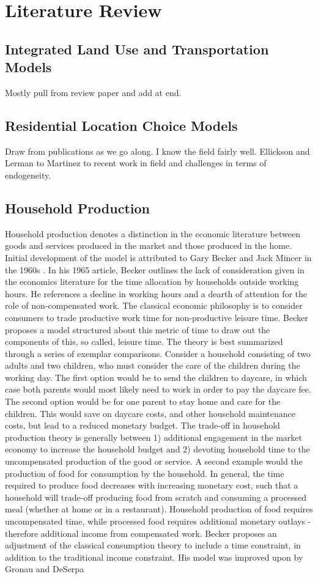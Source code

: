\chapter{Literature Review}
\section{Integrated Land Use and Transportation Models}
Mostly pull from review paper and add at end.

\section{Residential Location Choice Models}
Draw from publications as we go along. I know the field fairly well. Ellickson and Lerman to Martinez to recent work in field and challenges in terms of endogeneity.

\section{Household Production}
Household production denotes a distinction in the economic literature between goods and services produced in the market and those produced in the home. Initial development of the model is attributed to Gary Becker and Jack Mincer in the 1960s \cite{Becker1965}. In his 1965 article, Becker outlines the lack of consideration given in the economics literature for the time allocation by households outside working hours. He references a decline in working hours and a dearth of attention for the role of non-compensated work. The classical economic philosophy is to consider consumers to trade productive work time for non-productive leisure time. Becker proposes a model structured about this metric of time to draw out the components of this, so called, leisure time. The theory is best summarized through a series of exemplar comparisons. Consider a household consisting of two adults and two children, who must consider the care of the children during the working day. The first option would be to send the children to daycare, in which case both parents would most likely need to work in order to pay the daycare fee. The second option would be for one parent to stay home and care for the children. This would save on daycare costs, and other household maintenance costs, but lead to a reduced monetary budget. The trade-off in household production theory is generally between 1) additional engagement in the market economy to increase the household budget and 2) devoting household time to the uncompensated production of the good or service. A second example would the production of food for consumption by the household. In general, the time required to produce food decreases with increasing monetary cost, such that a household will trade-off producing food from scratch and consuming a processed meal (whether at home or in a restaurant). Household production of food requires uncompensated time, while processed food requires additional monetary outlays - therefore additional income from compensated work. Becker proposes an adjustment of the classical consumption theory to include a time constraint, in addition to the traditional income constraint. His model was improved upon by Gronau \cite{Gronau1977} and DeSerpa \cite{DeSerpa1971}


